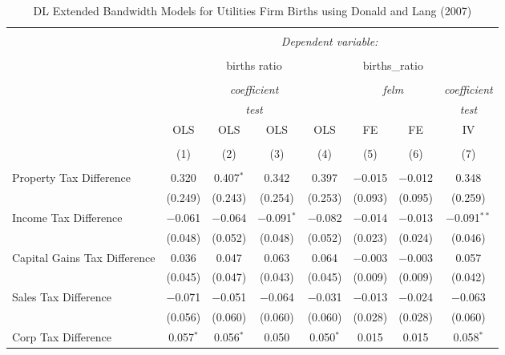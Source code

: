 
\begin{table}[!htbp] \centering 
  \caption{DL Extended Bandwidth Models for  Utilities Firm Births using Donald and Lang (2007)} 
  \label{} 
\begin{tabular}{@{\extracolsep{5pt}}lccccccc} 
\\[-1.8ex]\hline 
\hline \\[-1.8ex] 
 & \multicolumn{7}{c}{\textit{Dependent variable:}} \\ 
\cline{2-8} 
\\[-1.8ex] & \multicolumn{4}{c}{births ratio} & \multicolumn{2}{c}{births\_ratio} &   \\ 
\\[-1.8ex] & \multicolumn{4}{c}{\textit{coefficient}} & \multicolumn{2}{c}{\textit{felm}} & \textit{coefficient} \\ 
 & \multicolumn{4}{c}{\textit{test}} & \multicolumn{2}{c}{\textit{}} & \textit{test} \\ 
 & OLS & OLS & OLS & OLS & FE & FE & IV \\ 
\\[-1.8ex] & (1) & (2) & (3) & (4) & (5) & (6) & (7)\\ 
\hline \\[-1.8ex] 
 Property Tax Difference & 0.320 & 0.407$^{*}$ & 0.342 & 0.397 & $-$0.015 & $-$0.012 & 0.348 \\ 
  & (0.249) & (0.243) & (0.254) & (0.253) & (0.093) & (0.095) & (0.259) \\ 
  Income Tax Difference & $-$0.061 & $-$0.064 & $-$0.091$^{*}$ & $-$0.082 & $-$0.014 & $-$0.013 & $-$0.091$^{**}$ \\ 
  & (0.048) & (0.052) & (0.048) & (0.052) & (0.023) & (0.024) & (0.046) \\ 
  Capital Gains Tax Difference & 0.036 & 0.047 & 0.063 & 0.064 & $-$0.003 & $-$0.003 & 0.057 \\ 
  & (0.045) & (0.047) & (0.043) & (0.045) & (0.009) & (0.009) & (0.042) \\ 
  Sales Tax Difference & $-$0.071 & $-$0.051 & $-$0.064 & $-$0.031 & $-$0.013 & $-$0.024 & $-$0.063 \\ 
  & (0.056) & (0.060) & (0.060) & (0.060) & (0.028) & (0.028) & (0.060) \\ 
  Corp Tax Difference & 0.057$^{*}$ & 0.056$^{*}$ & 0.050 & 0.050$^{*}$ & 0.015 & 0.015 & 0.058$^{*}$ \\ 

\end{tabular}
\end{table}
